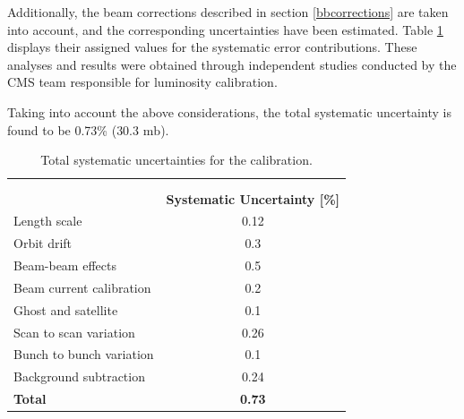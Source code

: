 Additionally, the beam corrections described in section \ref{bbcorrections} are taken into account, and the corresponding uncertainties have been estimated. Table \ref{systematics} displays their assigned values for the systematic error contributions. These analyses and results were obtained through independent studies conducted by the CMS team responsible for luminosity calibration.

Taking into account the above considerations, the total systematic uncertainty is found to be 0.73\% ($30.3 \text{ mb}$).
\newpage
\begin{table}[!ht]
\centering
\caption[Systematic Uncertainties]{Total systematic uncertainties for the calibration.}
\label{systematics}
\begin{tabular}{lc}
                               & \multicolumn{1}{l}{}       \\
                               & \multicolumn{1}{l}{}       \\
            & \textbf{Systematic Uncertainty [\%]}  \\ 
\toprule
Length scale                   & 0.12                        \\
Orbit drift                    & 0.3                        \\
Beam-beam effects              & 0.5                        \\
Beam current calibration       & 0.2                        \\
Ghost and satellite            & 0.1                        \\
Scan to scan variation         & 0.26                        \\
Bunch to bunch variation       & 0.1                        \\
Background subtraction         & 0.24                          \\ 
\hline
\textbf{Total}                 & \textbf{0.73}               
\end{tabular}
\end{table}


